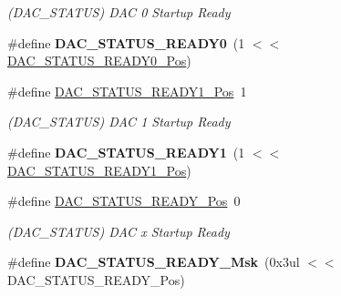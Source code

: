 \begin{DoxyCompactItemize}
\begin{DoxyCompactList}\small\item\em (D\+A\+C\+\_\+\+S\+T\+A\+T\+U\+S) D\+A\+C 0 Startup Ready \end{DoxyCompactList}\item 
\hypertarget{group___s_a_m_l21___d_a_c_ga93b26c48449c852d120576cf700cace4}{}\#define {\bfseries D\+A\+C\+\_\+\+S\+T\+A\+T\+U\+S\+\_\+\+R\+E\+A\+D\+Y0}~(1 $<$$<$ \hyperlink{group___s_a_m_l21___d_a_c_ga4486c687c5a4ab1839b2a265c050585c}{D\+A\+C\+\_\+\+S\+T\+A\+T\+U\+S\+\_\+\+R\+E\+A\+D\+Y0\+\_\+\+Pos})\label{group___s_a_m_l21___d_a_c_ga93b26c48449c852d120576cf700cace4}

\item 
\hypertarget{group___s_a_m_l21___d_a_c_ga18d69a63dd603174ef5ff40ea7afbb8e}{}\#define \hyperlink{group___s_a_m_l21___d_a_c_ga18d69a63dd603174ef5ff40ea7afbb8e}{D\+A\+C\+\_\+\+S\+T\+A\+T\+U\+S\+\_\+\+R\+E\+A\+D\+Y1\+\_\+\+Pos}~1\label{group___s_a_m_l21___d_a_c_ga18d69a63dd603174ef5ff40ea7afbb8e}

\begin{DoxyCompactList}\small\item\em (D\+A\+C\+\_\+\+S\+T\+A\+T\+U\+S) D\+A\+C 1 Startup Ready \end{DoxyCompactList}\item 
\hypertarget{group___s_a_m_l21___d_a_c_ga4d9ab86b0bc5a456d3228f8a6d4c3ecc}{}\#define {\bfseries D\+A\+C\+\_\+\+S\+T\+A\+T\+U\+S\+\_\+\+R\+E\+A\+D\+Y1}~(1 $<$$<$ \hyperlink{group___s_a_m_l21___d_a_c_ga18d69a63dd603174ef5ff40ea7afbb8e}{D\+A\+C\+\_\+\+S\+T\+A\+T\+U\+S\+\_\+\+R\+E\+A\+D\+Y1\+\_\+\+Pos})\label{group___s_a_m_l21___d_a_c_ga4d9ab86b0bc5a456d3228f8a6d4c3ecc}

\item 
\hypertarget{group___s_a_m_l21___d_a_c_ga466a35ff7aea713f86197f0fba85d7ae}{}\#define \hyperlink{group___s_a_m_l21___d_a_c_ga466a35ff7aea713f86197f0fba85d7ae}{D\+A\+C\+\_\+\+S\+T\+A\+T\+U\+S\+\_\+\+R\+E\+A\+D\+Y\+\_\+\+Pos}~0\label{group___s_a_m_l21___d_a_c_ga466a35ff7aea713f86197f0fba85d7ae}

\begin{DoxyCompactList}\small\item\em (D\+A\+C\+\_\+\+S\+T\+A\+T\+U\+S) D\+A\+C x Startup Ready \end{DoxyCompactList}\item 
\hypertarget{group___s_a_m_l21___d_a_c_ga8e72886b6e7644dd51dd8690223262ba}{}\#define {\bfseries D\+A\+C\+\_\+\+S\+T\+A\+T\+U\+S\+\_\+\+R\+E\+A\+D\+Y\+\_\+\+Msk}~(0x3ul $<$$<$ D\+A\+C\+\_\+\+S\+T\+A\+T\+U\+S\+\_\+\+R\+E\+A\+D\+Y\+\_\+\+Pos)\label{group___s_a_m_l21___d_a_c_ga8e72886b6e7644dd51dd8690223262ba}


\end{DoxyCompactItemize}
